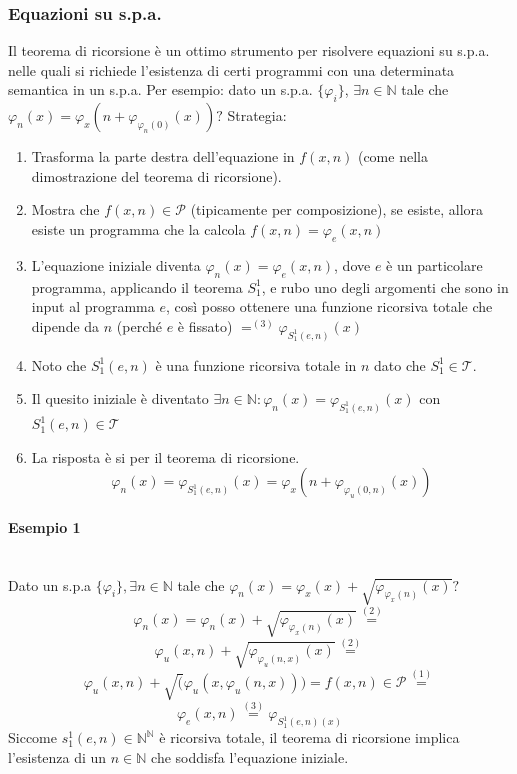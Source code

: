 \documentclass{article}
\begin{document}
\subsubsection{Equazioni su s.p.a.}
Il teorema di ricorsione è un ottimo strumento per risolvere equazioni su s.p.a.
nelle quali si richiede l'esistenza di certi programmi con una determinata semantica
in un s.p.a. Per esempio: dato un s.p.a. $\{\varphi_i\}$, $\exists n\in\mathbb{N}$ tale che
$\varphi_n(x)=\varphi_x(n+\varphi_{\varphi_n(0)}(x))?$
Strategia:
\begin{enumerate}
    \item Trasforma la parte destra dell'equazione in $f(x,n)$ (come nella dimostrazione del teorema di ricorsione).
    \item Mostra che $f(x,n)\in\mathcal{P}$ (tipicamente per composizione), se esiste, allora esiste un programma che la calcola
          $f(x,n)=\varphi_e(x,n)$
    \item L'equazione iniziale diventa $\varphi_n(x)=\varphi_e(x,n)$, dove $e$ è un particolare programma,
          applicando il teorema $S_1^1$, e rubo uno degli argomenti che sono in input al programma $e$,
          così posso ottenere una funzione ricorsiva totale che dipende da $n$ (perché $e$ è fissato) $=^{(3)}\varphi_{S_1^1(e,n)}(x)$
    \item Noto che $S_1^1(e,n)$ è una funzione ricorsiva totale in $n$ dato che $S_1^1\in\mathcal{T}$.
    \item Il quesito iniziale è diventato $\exists n\in\mathbb{N}:\varphi_n(x)=\varphi_{S_1^1 (e,n)}(x)$
          con $S_1^1(e,n)\in\mathcal{T}$
    \item La risposta è si per il teorema di ricorsione.
    $$\varphi_n(x)=\varphi_{S_1^1(e,n)}(x)=\varphi_x(n+\varphi_{\varphi_u(0,n)}(x))$$
\end{enumerate}

\paragraph{Esempio 1}\mbox{}\\
Dato un s.p.a $\{\varphi_i\},\exists n\in\mathbb{N}$ tale che $\varphi_n(x)=\varphi_x(x)+\sqrt{\varphi_{\varphi_x(n)}(x)}?$
$$\varphi_n(x)=\varphi_n(x)+\sqrt{\varphi_{\varphi_x(n)}(x)}\overset{(2)}{=}$$
$$\varphi_u(x,n)+\sqrt{\varphi_{\varphi_u(n,x)}(x)}\overset{(2)}{=}$$
$$\varphi_u(x,n)+\sqrt(\varphi_u(x,\varphi_u(n,x)))=f(x,n)\in\mathcal{P}\overset{(1)}{=}$$
$$\varphi_e(x,n)\overset{(3)}{=}\varphi_{S_1^1(e,n)(x)}$$
Siccome $s_1^1(e,n)\in\mathbb{N}^\mathbb{N}$ è ricorsiva totale, il teorema di ricorsione implica l'esistenza di un
$n\in\mathbb{N}$ che soddisfa l'equazione iniziale.
\end{document}
